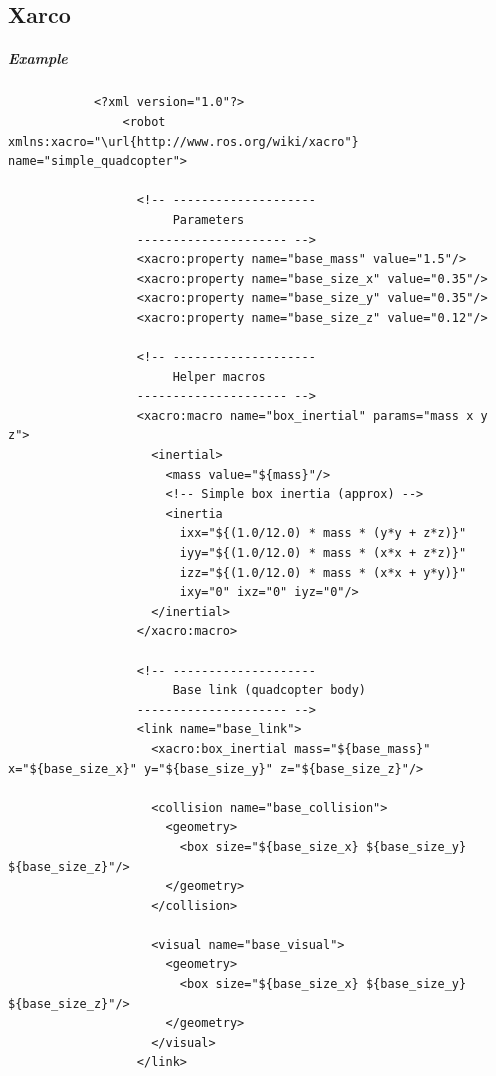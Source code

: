\documentclass{book}
\begin{document}
\subsection{Xarco}


\subparagraph{Example}
        \begin{verbatim}
            <?xml version="1.0"?>
                <robot xmlns:xacro="\url{http://www.ros.org/wiki/xacro"} name="simple_quadcopter">
                
                  <!-- --------------------
                       Parameters
                  --------------------- -->
                  <xacro:property name="base_mass" value="1.5"/>
                  <xacro:property name="base_size_x" value="0.35"/>
                  <xacro:property name="base_size_y" value="0.35"/>
                  <xacro:property name="base_size_z" value="0.12"/>
                
                  <!-- --------------------
                       Helper macros
                  --------------------- -->
                  <xacro:macro name="box_inertial" params="mass x y z">
                    <inertial>
                      <mass value="${mass}"/>
                      <!-- Simple box inertia (approx) -->
                      <inertia
                        ixx="${(1.0/12.0) * mass * (y*y + z*z)}"
                        iyy="${(1.0/12.0) * mass * (x*x + z*z)}"
                        izz="${(1.0/12.0) * mass * (x*x + y*y)}"
                        ixy="0" ixz="0" iyz="0"/>
                    </inertial>
                  </xacro:macro>
                
                  <!-- --------------------
                       Base link (quadcopter body)
                  --------------------- -->
                  <link name="base_link">
                    <xacro:box_inertial mass="${base_mass}" x="${base_size_x}" y="${base_size_y}" z="${base_size_z}"/>
                
                    <collision name="base_collision">
                      <geometry>
                        <box size="${base_size_x} ${base_size_y} ${base_size_z}"/>
                      </geometry>
                    </collision>
                
                    <visual name="base_visual">
                      <geometry>
                        <box size="${base_size_x} ${base_size_y} ${base_size_z}"/>
                      </geometry>
                    </visual>
                  </link>
                

\end{verbatim}
\end{document}
